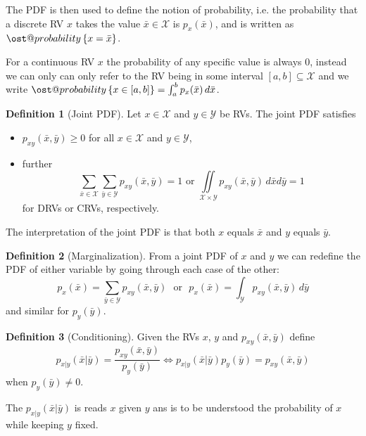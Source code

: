 \documentclass[]{hsrzf}
\makeatletter
\renewcommand*{\Pr}[2][]{\ost@probability_{#1}\left\{#2\right\}}
\theoremstyle{plain}
\theoremstyle{definition}
\newtheorem{defn}{Definition}[section]
\theoremstyle{remark}
\makeatother
\begin{document}
\ifexamprint\else
The PDF is then used to define the notion of probability, i.e. the probability
that a discrete RV $x$ takes the value $\bar{x} \in \mathcal{X}$ is
$p_x(\bar{x})$, and is written as $\Pr{x = \bar{x}}$.

For a continuous RV $x$ the probability of any specific value is always 0,
instead we can only can only refer to the RV being in some interval $[a,b]
\subseteq \mathcal{X}$ and we write $\Pr{x \in [a,b]} = \int_a^b p_x(\bar{x})
\,d\bar{x}$.
\fi

\begin{defn}[Joint PDF]
  Let $x \in \mathcal{X}$ and $y \in \mathcal{Y}$ be RVs. The joint PDF
  satisfies
  \begin{itemize}
    \item $p_{xy}(\bar{x}, \bar{y}) \geq 0$ for all $x \in\mathcal{X}$ and $y
      \in \mathcal{Y}$,
    \item further
      \[
        \sum_{\bar{x}\in\mathcal{X}}\sum_{\bar{y}\in\mathcal{Y}}
        p_{xy}(\bar{x}, \bar{y}) = 1
        \text{ or }
        \iint\limits_{\mathcal{X}\times\mathcal{Y}} p_{xy}(\bar{x}, \bar{y})
        \,d\bar{x}d\bar{y} = 1
      \]
      for DRVs or CRVs, respectively.
  \end{itemize}
\end{defn}

The interpretation of the joint PDF is that both $x$ equals $\bar{x}$ and $y$
equals $\bar{y}$.

\begin{defn}[Marginalization]
  From a joint PDF of $x$ and $y$ we can redefine the PDF of either variable
  by going through each case of the other:
  \[
    p_x(\bar{x}) = \sum_{\bar{y} \in \mathcal{Y}} p_{xy} (\bar{x}, \bar{y})
    \text{~~or~~}
    p_x(\bar{x}) = \int_\mathcal{Y} p_{xy} (\bar{x}, \bar{y}) \,
    d\bar{y}
  \]
  and similar for $p_y(\bar{y})$.
\end{defn}

\begin{defn}[Conditioning]
  Given the RVs $x$, $y$ and $p_{xy}(\bar{x}, \bar{y})$ define
  \[
    p_{x|y}(\bar{x} | \bar{y}) = \frac{p_{xy}(\bar{x}, \bar{y})}{p_y(\bar{y})}
    \iff
    p_{x|y}(\bar{x} | \bar{y}) p_y(\bar{y}) = p_{xy}(\bar{x}, \bar{y})
  \]
  when $p_y(\bar{y}) \neq 0$.
\end{defn}

The $p_{x|y}(\bar{x} | \bar{y})$ is reads $x$ given $y$ ans is to be
understood the probability of $x$ while keeping $y$ fixed.
\end{document}
